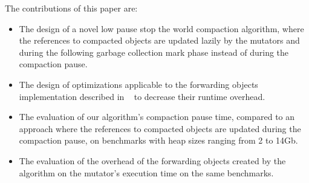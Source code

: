 \documentclass[sigplan,10pt,screen]{acmart}\settopmatter{printfolios=true,printccs=true,printacmref=true}
\newcommand{\egb}[1]{\color{blue}\fbox{\bfseries\sffamily\scriptsize Elisa:}{\sf\small$\blacktriangleright$\textit{#1}$\blacktriangleleft$}\color{black}}
\begin{document}
The contributions of this paper are:
\vspace{-0.08cm}
\begin{itemize}
\item The design of a novel low pause stop the world compaction algorithm, where the references to compacted objects are updated lazily by the mutators and during the following garbage collection mark phase instead of during the compaction pause. 
\item The design of optimizations applicable to the forwarding objects implementation described in ~\cite{Forwarders} to decrease their runtime overhead.
\item 
The evaluation of our algorithm's compaction pause time, compared to an approach where the references to compacted objects are updated during the compaction pause, on benchmarks with heap sizes ranging from 2 to 14Gb.
\item The evaluation of the overhead of the forwarding objects created by the algorithm on the mutator's execution time on the same benchmarks.
\end{itemize}
\vspace{-0.2cm} %


\end{document}

